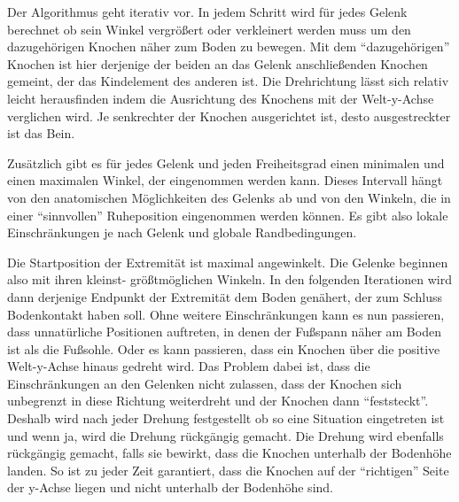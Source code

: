 Der Algorithmus geht iterativ vor.
In jedem Schritt wird für jedes Gelenk berechnet ob sein Winkel vergrößert oder verkleinert werden muss um den dazugehörigen Knochen näher zum Boden zu bewegen.
Mit dem "`dazugehörigen"' Knochen ist hier derjenige der beiden an das Gelenk anschließenden Knochen gemeint, der das Kindelement des anderen ist.
Die Drehrichtung lässt sich relativ leicht herausfinden indem die Ausrichtung des Knochens mit der Welt-y-Achse verglichen wird. Je senkrechter der Knochen ausgerichtet ist, desto ausgestreckter ist das Bein.

Zusätzlich gibt es für jedes Gelenk und jeden Freiheitsgrad einen minimalen und einen maximalen Winkel, der eingenommen werden kann. Dieses Intervall hängt von den anatomischen Möglichkeiten des Gelenks ab und von den Winkeln, die in einer "`sinnvollen"' Ruheposition eingenommen werden können. 
Es gibt also lokale Einschränkungen je nach Gelenk und globale Randbedingungen. %

Die Startposition der Extremität ist maximal angewinkelt. Die Gelenke beginnen also mit ihren kleinst- \bzw größtmöglichen Winkeln. In den folgenden Iterationen wird dann derjenige Endpunkt der Extremität dem Boden genähert, der zum Schluss Bodenkontakt haben soll. 
Ohne weitere Einschränkungen kann es nun passieren, dass unnatürliche Positionen auftreten, in denen \zb der Fußspann näher am Boden ist als die Fußsohle.
Oder es kann passieren, dass ein Knochen über die positive Welt-y-Achse hinaus gedreht wird. Das Problem dabei ist, dass die Einschränkungen an den Gelenken nicht zulassen, dass der Knochen sich unbegrenzt in diese Richtung weiterdreht und der Knochen dann "`feststeckt"'. Deshalb wird nach jeder Drehung festgestellt ob so eine Situation eingetreten ist und wenn ja, wird die Drehung rückgängig gemacht.
Die Drehung wird ebenfalls rückgängig gemacht, falls sie bewirkt, dass die Knochen unterhalb der Bodenhöhe landen.
So ist zu jeder Zeit garantiert, dass die Knochen auf der "`richtigen"' Seite der y-Achse liegen und nicht unterhalb der Bodenhöhe sind. %

